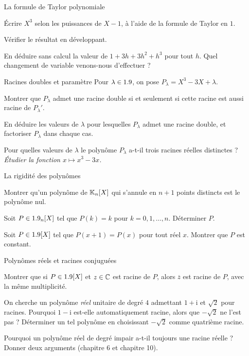 \begin{exercice}[2]{La formule de Taylor polynomiale}
\begin{questions}
  \item Écrire $X^{3}$ selon les puissances de $X-1$, à l'aide de la
    formule de Taylor en $1$.
  \item Vérifier le résultat en développant.
  \item En déduire sans calcul la valeur de
    $1+3h+3h^{2}+h^{3}$ pour tout $h$. Quel changement de variable
    venons-nous d'effectuer ?
\end{questions}
\end{exercice}

\begin{exercice}[2]{Racines doubles et paramètre}
Pour $\lambda\in1.9$, on pose $P_\lambda=X^{3}-3X+\lambda$.
\begin{questions}
  \item Montrer que $P_\lambda$ admet une racine double si et seulement si
    cette racine est aussi racine de $P_\lambda'$.
  \item En déduire les valeurs de $\lambda$ pour lesquelles $P_\lambda$
    admet une racine double, et factoriser $P_\lambda$ dans chaque cas.
  \item Pour quelles valeurs de $\lambda$ le polynôme $P_\lambda$ a-t-il
    trois racines réelles distinctes ? \emph{Étudier la fonction
    $x\mapsto x^{3}-3x$.}
\end{questions}
\end{exercice}

\begin{exercice}[2]{La rigidité des polynômes}
\begin{questions}
  \item Montrer qu'un polynôme de $\mathbb{K}_n[X]$ qui s'annule en $n+1$ points
    distincts est le polynôme nul.
  \item Soit $P\in1.9_n[X]$ tel que $P(k)=k$ pour $k=0,1,\dots,n$.
    Déterminer $P$.
  \item Soit $P\in1.9[X]$ tel que $P(x+1)=P(x)$ pour tout réel $x$.
    Montrer que $P$ est constant.
\end{questions}
\end{exercice}

\begin{exercice}[2]{Polynômes réels et racines conjuguées}
\begin{questions}
  \item Montrer que si $P\in1.9[X]$ et $z\in\mathbb{C}$ est racine de $P$, alors
    $\overline{z}$ est racine de $P$, avec la même multiplicité.
  \item On cherche un polynôme \emph{réel} unitaire de degré $4$ admettant
    $1+\mathrm{i}$ et $\sqrt2$ pour racines. Pourquoi $1-\mathrm{i}$ est-elle
    automatiquement racine, alors que $-\sqrt2$ ne l'est pas ? Déterminer un
    tel polynôme en choisissant $-\sqrt2$ comme quatrième racine.
  \item Pourquoi un polynôme réel de degré impair a-t-il toujours une
    racine réelle ? Donner deux arguments (chapitre 6 et chapitre 10).
\end{questions}
\end{exercice}

